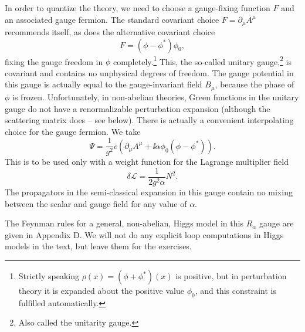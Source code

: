 In order to quantize the theory, we need to choose a gauge-fixing function $F$
and an associated gauge fermion. The standard covariant choice
$F=\partial_\mu A^\mu$ recommends itself, as does the alternative covariant
choice
\begin{equation*}
  F=(\phi-\phi^*)\phi_0,
\end{equation*}
fixing the gauge freedom in $\phi$ completely.\footnote[7]{Strictly speaking
$\rho(x)=(\phi+\phi^*)(x)$ is positive, but in perturbation theory it is
expanded about the positive value $\phi_0$, and this constraint is fulfilled
automatically.} This, the so-called unitary gauge,\footnote[8]{Also called the
unitarity gauge.} is covariant and contains no unphysical degrees of freedom.
The gauge potential in this gauge is actually equal to the gauge-invariant
field $B_\mu$, because the phase of $\phi$ is frozen. Unfortunately, in
non-abelian theories, Green functions in the unitary gauge do not have a
renormalizable perturbation expansion (although the scattering matrix does --
see below). There is actually a convenient interpolating choice for the gauge
fermion. We take
\begin{equation*}
  \Psi=\frac{1}{g^2}\bar c(\partial_\mu A^\mu
  +\ii\alpha\phi_0(\phi-\phi^*)).
\end{equation*}
This is to be used only with a weight function for the Lagrange multiplier
field
\begin{equation*}
  \delta\mathcal L=\frac{1}{2g^2\alpha}N^2.
\end{equation*}
The propagators in the semi-classical expansion in this gauge contain no mixing
between the scalar and gauge field for any value of $\alpha$.

The Feynman rules for a general, non-abelian, Higgs model in this $R_\alpha$
gauge are given in Appendix D. We will not do any explicit loop computations
in Higgs models in the text, but leave them for the exercises.

